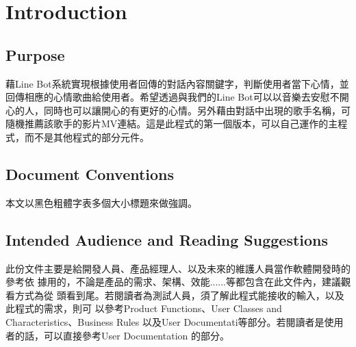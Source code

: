 \documentclass{scrreprt}
\begin{document}
\chapter{Introduction}

\section{Purpose}
\begin{CJK}{UTF8}{<font>}
藉Line Bot系統實現根據使用者回傳的對話內容關鍵字，判斷使用者當下心情，並回傳相應的心情歌曲給使用者。希望透過與我們的Line Bot可以以音樂去安慰不開心的人，同時也可以讓開心的有更好的心情。另外藉由對話中出現的歌手名稱，可隨機推薦該歌手的影片MV連結。這是此程式的第一個版本，可以自己運作的主程式，而不是其他程式的部分元件。
\end{CJK}

\section{Document Conventions}
\begin{CJK}{UTF8}{<font>}
 本文以黑色粗體字表多個大小標題來做強調。
\end{CJK}

\section{Intended Audience and Reading Suggestions}
\begin{CJK}{UTF8}{<font>}
此份文件主要是給開發人員、產品經理人、以及未來的維護人員當作軟體開發時的參考依
據用的，不論是產品的需求、架構、效能......等都包含在此文件內，建議觀看方式為從
頭看到尾。若閱讀者為測試人員，須了解此程式能接收的輸入，以及此程式的需求，則可
以參考Product Functions、User Classes and Characteristics、Business Rules
以及User Documentati等部分。若閱讀者是使用者的話，可以直接參考User Documentation
的部分。
\end{CJK}
\end{document}
